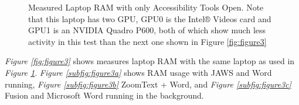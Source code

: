 \begin{figure}[H]
\caption[Measured Laptop RAM with only Accessibility Tools Open]{Measured Laptop RAM with only Accessibility Tools Open.  Note that this laptop has two GPU, GPU0 is the Intel® Videos card and GPU1 is an NVIDIA Quadro P600, both of which show much less activity in this test than the next one shown in Figure \ref{fig:figure3}}
\label{fig:figure2}
\end{figure}

\newpage \textit{Figure \ref{fig:figure3}} shows measures laptop RAM with the same laptop as used in \textit{Figure \ref{fig:figure2}}. \textit{Figure \ref{subfig:figure3a}} shows RAM usage with JAWS and Word running, \textit{Figure \ref{subfig:figure3b}} ZoomText + Word, and \textit{Figure \ref{subfig:figure3c}} Fusion and Microsoft Word running in the background.

\begin{figure}[H]
\centering
{} \\   \hfill
{}

\end{figure}
